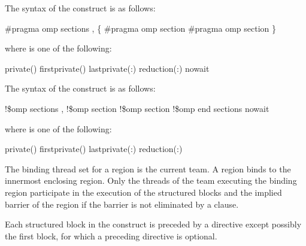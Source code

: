 \syntax
\ccppspecificstart
The syntax of the  construct is as follows:

\begin{boxedcode}
\#pragma omp sections \plc{[clause[ [},\plc{] clause] ... ] new-line}
   \{
   \plc{[}\#pragma omp section \plc{]}
   \plc{[}\#pragma omp section 
      \plc{structured-block]}
   \}
\end{boxedcode}

where  is one of the following: 

\begin{indentedcodelist}
private()
firstprivate()
lastprivate(\plc{[ lastprivate-modifier}:\plc{] list})
reduction(:)
nowait
\end{indentedcodelist}
\ccppspecificend

\begin{samepage}
\fortranspecificstart
The syntax of the  construct is as follows:

\begin{boxedcode}
!\$omp sections \plc{[clause[ [},\plc{] clause] ... ]}
   \plc{[}!\$omp section\plc{]}
   \plc{[}!\$omp section
      \plc{structured-block]}
!\$omp end sections \plc{[}nowait\plc{]}
\end{boxedcode}
\end{samepage}

\begin{samepage}
where  is one of the following:

\begin{indentedcodelist}
private()
firstprivate()
lastprivate(\plc{[ lastprivate-modifier}:\plc{] list})
reduction(:)
\end{indentedcodelist}
\fortranspecificend
\end{samepage}

\binding
The binding thread set for a  region is the current team. A  
region binds to the innermost enclosing  region. Only the threads of the team 
executing the binding  region participate in the execution of the structured 
blocks and the implied barrier of the  region if the barrier is not eliminated 
by a  clause.

\descr
Each structured block in the  construct is preceded by a  directive 
except possibly the first block, for which a preceding  directive is optional.

